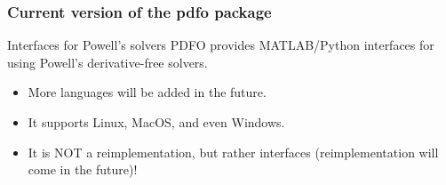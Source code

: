 \documentclass[usenames,dvipsnames,10pt]{beamer}
\begin{document}
\begin{frame}
    \frametitle{Current version of the \gls{pdfo} package}

    \begin{exampleblock}{Interfaces for Powell's solvers}
        PDFO provides MATLAB/Python \alert{interfaces} for using Powell's derivative-free solvers.
        \addtolength{\leftmargini}{\dimexpr\medskipamount+.2ex\relax}
        \begin{itemize}
            \item More \alert{languages} will be added in the future.
            \item It supports Linux, MacOS, and \alert{even Windows}.
            \item It is \alert{NOT} a reimplementation, but rather interfaces (reimplementation will come in the future)!
        \end{itemize}
    \end{exampleblock}

    \begin{figure}
        \centering
    \end{figure}
\end{frame}
\end{document}
